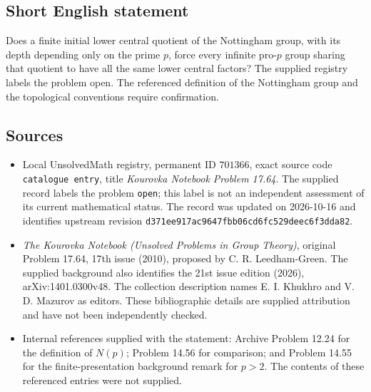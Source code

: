 \documentclass[11pt]{article}
\begin{document}
\subsection{Short English statement}
Does a finite initial lower central quotient of the Nottingham group, with its depth depending only on the prime \(p\), force every infinite pro-\(p\) group sharing that quotient to have all the same lower central factors? The supplied registry labels the problem open. The referenced definition of the Nottingham group and the topological conventions require confirmation.
\subsection{Sources}
\begin{itemize}
\item Local UnsolvedMath registry, permanent ID \(701366\), exact source code \texttt{catalogue entry}, title \emph{Kourovka Notebook Problem 17.64}. The supplied record labels the problem \texttt{open}; this label is not an independent assessment of its current mathematical status. The record was updated on 2026-10-16 and identifies upstream revision \texttt{d371ee917ac9647fbb06cd6fc529deec6f3dda82}.
\item \emph{The Kourovka Notebook (Unsolved Problems in Group Theory)}, original Problem 17.64, 17th issue (2010), proposed by C. R. Leedham-Green. The supplied background also identifies the 21st issue edition (2026), arXiv:1401.0300v48. The collection description names E. I. Khukhro and V. D. Mazurov as editors. These bibliographic details are supplied attribution and have not been independently checked.
\item Internal references supplied with the statement: Archive Problem 12.24 for the definition of \(N(p)\); Problem 14.56 for comparison; and Problem 14.55 for the finite-presentation background remark for \(p>2\). The contents of these referenced entries were not supplied.
\end{itemize}
\end{document}
